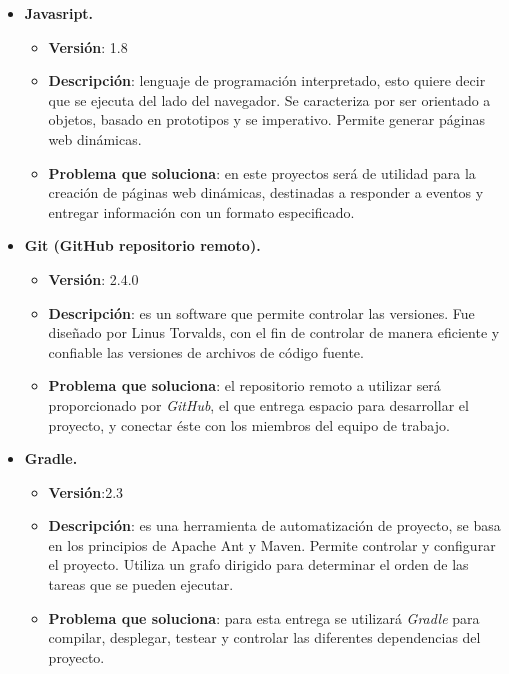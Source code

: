 \documentclass{memoria}
\begin{document}
\begin{itemize}
\item \textbf{Javasript.}
	\begin{itemize}
	\item \textbf{Versión}: 1.8 
	\item \textbf{Descripción}: lenguaje de programación interpretado, esto quiere decir que se ejecuta del lado del navegador. Se caracteriza por ser orientado a objetos, basado en prototipos y se imperativo. Permite generar páginas web dinámicas. 
	\item \textbf{Problema que soluciona}: en este proyectos será de utilidad para la creación de páginas web dinámicas, destinadas  a responder a eventos y entregar información con un formato especificado.
	\end{itemize}
	
\item \textbf{Git (GitHub repositorio remoto).}
	\begin{itemize}
	\item \textbf{Versión}: 2.4.0  
	\item \textbf{Descripción}: es un software que permite controlar las versiones. Fue diseñado por Linus Torvalds, con el fin de controlar de manera eficiente y confiable las versiones de archivos de código fuente. 
	\item \textbf{Problema que soluciona}: el repositorio remoto a utilizar será proporcionado por \textsl{GitHub}, el que entrega espacio para desarrollar el proyecto, y conectar éste con los miembros del equipo de trabajo. 
	\end{itemize}
	
\item \textbf{Gradle.}
	\begin{itemize}
	\item \textbf{Versión}:2.3 
	\item \textbf{Descripción}: es una herramienta de automatización de proyecto, se basa en los principios de Apache Ant y Maven. Permite controlar y configurar el proyecto. Utiliza un grafo dirigido para determinar el orden de las tareas que se pueden ejecutar.  
	\item \textbf{Problema que soluciona}: para esta entrega se utilizará \textsl{Gradle} para compilar, desplegar, testear y controlar las diferentes dependencias del proyecto. 
	\end{itemize}
	

\end{itemize}
\end{document}

